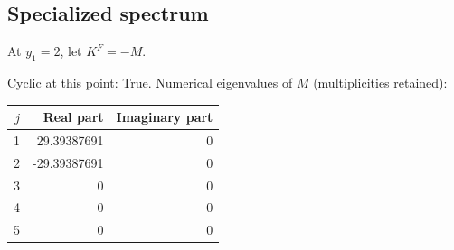 \documentclass[10pt,a4paper]{article}
\newcommand{\fitmath}[1]{\sbox{\mathbox}{$\displaystyle #1$}\ifdim\wd\mathbox>\linewidth\resizebox{\linewidth}{!}{\usebox{\mathbox}}\else\usebox{\mathbox}\fi}
\begin{document}
\subsection*{Specialized spectrum}
At $y_1=2$, let $K^F=-M$.
\begin{center}\fitmath{\Delta=1024}\end{center}
Cyclic at this point: True.
Numerical eigenvalues of $M$ (multiplicities retained):
\begin{center}\small\begin{tabular}{rrr}\toprule $j$ & Real part & Imaginary part\\\midrule
1 & 29.39387691 & 0\\
2 & -29.39387691 & 0\\
3 & 0 & 0\\
4 & 0 & 0\\
5 & 0 & 0\\
\bottomrule\end{tabular}\end{center}
\end{document}
